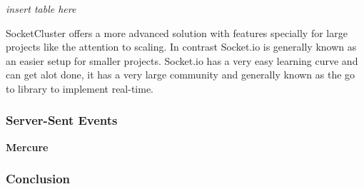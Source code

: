 \textit{insert table here}

SocketCluster offers a more advanced solution with features specially for large projects like the attention to scaling. In contrast Socket.io is generally known as an easier setup for smaller projects. Socket.io has a very easy learning curve and can get alot done, it has a very large community and generally known as the go to library to implement real-time.




\subsubsection{Server-Sent Events}

\textbf{Mercure}

\subsubsection{Conclusion}
